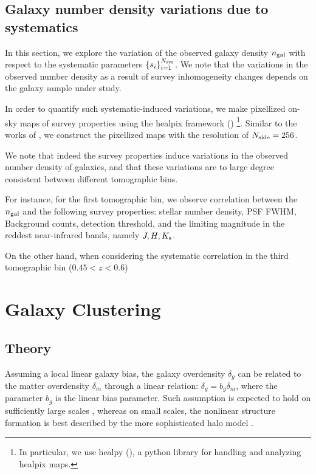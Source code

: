 \documentclass[fleqn,usenatbib,useAMS]{mnras}
\begin{document}
\subsection{Galaxy number density variations due to systematics}

In this section, we explore the variation of the observed galaxy density $n_{\rm gal}$ with respect to the systematic parameters $\{s_i\}_{i=1}^{N_{\rm sys}}$. We note that the variations in the observed number density as a result of survey inhomogeneity changes depends on the galaxy sample under study. 

In order to quantify such systematic-induced variations, we make pixellized on-sky maps of survey properties using the healpix framework (\citealt{healpix}) \footnote{In particular, we use healpy (\citealt{healpy2019}), a python library for handling and analyzing healpix maps.}. Similar to the works of \citet{ross2017, rezaie2019}, we construct the pixellized maps with the resolution of $N_{\rm side} = 256$.

We note that indeed the survey properties induce variations in the 
observed number density of galaxies, and that these variations are to large degree consistent between different tomographic bins. 

For instance, for the first tomographic bin, we observe correlation between the $n_{\rm gal}$ and the following survey properties: stellar number density, PSF FWHM, Background counts, detection threshold, and the limiting magnitude in the reddest near-infrared bands, namely $J, H, K_{\rm s}$. 

On the other hand, when considering the systematic correlation in the third tomographic bin ($0.45<z<0.6$)

\section{Galaxy Clustering}\label{sec:clustering}
\subsection{Theory}

Assuming a local linear galaxy bias, the galaxy overdensity $\delta_g$ can be related to the matter overdensity $\delta_m$ through a linear relation: $\delta_g = b_g \delta_m$, where the parameter $b_g$ is the linear bias parameter. Such assumption is expected to hold on sufficiently large scales \citep[e.g.][]{dvornik2018}, whereas on small scales, the nonlinear structure formation is best described by the more sophisticated halo model \citep[e.g. ][]{hand2017,vakili_hahn}.
\end{document}
